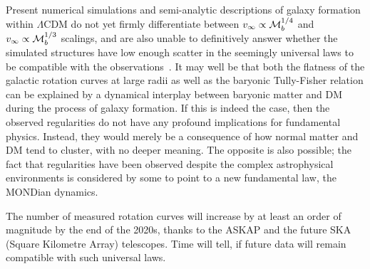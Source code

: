 Present numerical simulations and semi-analytic descriptions of galaxy formation within $\Lambda$CDM  do not yet
firmly differentiate between $v_\infty \propto {\cal M}_b^{1/4}$ and $v_\infty \propto {\cal M}_b^{1/3}$ scalings, and are also unable to definitively answer whether 
the simulated structures have low enough scatter in the seemingly universal laws to be compatible with the observations~\cite{DMvsa0}.
It may well be that both the flatness of the galactic rotation curves at large radii as well as the baryonic Tully-Fisher relation can be explained by a dynamical interplay between baryonic matter and DM during the process of galaxy formation. If this is indeed the case, then the observed regularities do not have any profound implications for fundamental physics. Instead, they would merely be a consequence of how normal matter and DM tend to cluster, with no deeper meaning.
The opposite is also possible; the fact that regularities have been observed despite the complex astrophysical environments is considered by some to 
point to a new fundamental law, the MONDian dynamics.

The number of measured rotation curves will increase by at least an order of magnitude by the end of the 2020s,
thanks to the ASKAP and the future SKA (Square Kilometre Array) telescopes. 
Time will tell, if future data will remain compatible with such universal laws.

\smallskip




